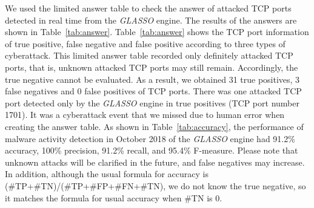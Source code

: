 \documentclass[conference]{IEEEtran}
\begin{document}
We used the limited answer table to check the answer of attacked TCP ports detected in real time from the {\it GLASSO} engine.
The results of the answers are shown in Table~\ref{tab:answer}.
Table~\ref{tab:answer} shows the TCP port information of true positive, false negative and false positive according to three types of cyberattack.
This limited answer table recorded only definitely attacked TCP ports, that is, unknown attacked TCP ports may still remain.
Accordingly, the true negative cannot be evaluated.
As a result, we obtained 31 true positives, 3 false negatives and 0 false positives of TCP ports.
There was one attacked TCP port detected only by the {\it GLASSO} engine in true positives (TCP port number 1701).
It was a cyberattack event that we missed due to human error when creating the answer table.
As shown in Table~\ref{tab:accuracy}, the performance of malware activity detection in October 2018 of the {\it GLASSO} engine had 91.2\% accuracy, 100\% precision, 91.2\% recall, and 95.4\% F-measure.
Please note that unknown attacks will be clarified in the future, and false negatives may increase.
In addition, although the usual formula for accuracy is (\#TP+\#TN)/(\#TP+\#FP+\#FN+\#TN), we do not know the true negative, so it matches the formula for usual accuracy when \#TN is 0.
\end{document}
